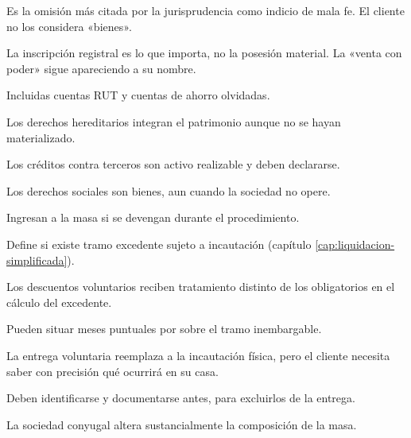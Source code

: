 \begin{cuestionario}
  {Es la omisión más citada por la jurisprudencia como indicio de mala fe. El cliente no
  los considera «bienes».}

  {La inscripción registral es lo que importa, no la posesión material. La «venta con
  poder» sigue apareciendo a su nombre.}

  {Incluidas cuentas RUT y cuentas de ahorro olvidadas.}

  {Los derechos hereditarios integran el patrimonio aunque no se hayan materializado.}

  {Los créditos contra terceros son activo realizable y deben declararse.}

  {Los derechos sociales son bienes, aun cuando la sociedad no opere.}

  {Ingresan a la masa si se devengan durante el procedimiento.}
\end{cuestionario}

\begin{cuestionario}[Remuneración]
  {Define si existe tramo excedente sujeto a incautación (capítulo
  \ref{cap:liquidacion-simplificada}).}

  {Los descuentos voluntarios reciben tratamiento distinto de los obligatorios en el
  cálculo del excedente.}

  {Pueden situar meses puntuales por sobre el tramo inembargable.}
\end{cuestionario}

\begin{cuestionario}
  {La entrega voluntaria reemplaza a la incautación física, pero el cliente necesita saber
  con precisión qué ocurrirá en su casa.}

  {Deben identificarse y documentarse antes, para excluirlos de la entrega.}

  {La sociedad conyugal altera sustancialmente la composición de la masa.}
\end{cuestionario}

